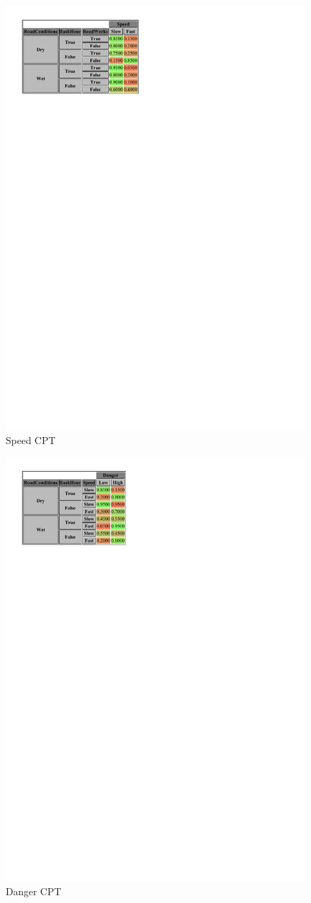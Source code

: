 \documentclass[a4paper,12pt]{article} %
\begin{document}
\begin{figure}[H]
	\centering
	\includegraphics[width=.8\linewidth]{../code/speed.pdf}	
	\caption{Speed CPT}
	\label{fig:speed}
\end{figure}

\begin{figure}[H]
	\centering
	\includegraphics[width=.8\linewidth]{../code/danger.pdf}	
	\caption{Danger CPT}
	\label{fig:danger}
\end{figure}
\end{document}

